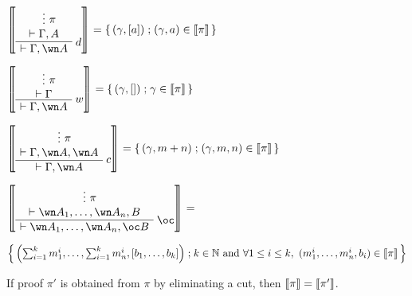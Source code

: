 \begin{itemize}
\(\sem{ \AxRule{}
\VdotsRule{ \pi }{ \vdash \Gamma, A }
\LabelRule{ d }
\UnaRule{ \vdash \Gamma, \wn A }
\DisplayProof} =
\set{(\gamma,[a])}{(\gamma,a)\in\sem\pi}
\)

\(\sem{
\AxRule{}
\VdotsRule{ \pi }{ \vdash \Gamma }
\LabelRule{ w }
\UnaRule{ \vdash \Gamma, \wn A }
\DisplayProof} =  \set{(\gamma,[])}{\gamma\in\sem\pi}\)

\(\sem{
\AxRule{}
\VdotsRule{ \pi }{ \vdash \Gamma, \wn A, \wn A }
\LabelRule{ c }
\UnaRule{ \vdash \Gamma, \wn A }
\DisplayProof} =  \set{(\gamma,m+n)}{(\gamma,m,n)\in\sem\pi}\)

\(\sem{
\AxRule{}
\VdotsRule{ \pi }{ \vdash \wn A_1,\ldots,\wn A_n,B }
\LabelRule{ \oc }
\UnaRule{ \vdash \wn A_1,\ldots,\wn A_n,\oc B }
\DisplayProof} =\)

\qquad\(
 \set{
\left(\sum_{i=1}^k m_1^i,\ldots,\sum_{i=1}^k m_n^i,[b_1,\ldots,b_k]\right)}
{k \in \mathbb{N}\text{ and }\forall 1 \leq i \leq k,\ (m_1^i,\ldots,m_n^i,b_i)\in\sem\pi}\)
\end{itemize}

\begin{theorem}
If proof $\pi'$ is obtained from $\pi$ by eliminating a cut,  then $\left\llbracket \pi\right\rrbracket=\left\llbracket \pi'\right\rrbracket$.
\end{theorem}

